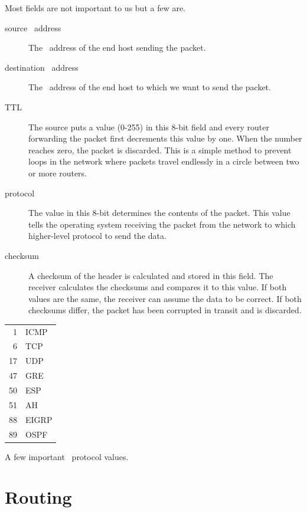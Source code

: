 Most fields are not important to us but a few are.
\begin{description}
\item[source \IP\ address]
   The \IP\ address of the end host sending the packet.
\item[destination \IP\ address]
   The \IP\ address of the end host to which we want to send the packet.
\item[\acf{TTL}]
   The source puts a value (0-255) in this 8-bit field and every router forwarding the packet first decrements this value by one.
   When the number reaches zero, the packet is discarded.
   This is a simple method to prevent loops in the network where packets travel endlessly in a circle between two or more routers.
\item[protocol]
   The value in this 8-bit determines the contents of the packet.
   This value tells the operating system receiving the packet from the network to which higher-level protocol to send the data.
\item[checksum]
   A checksum of the header is calculated and stored in this field.
   The receiver calculates the checksums and compares it to this value.
   If both values are the same, the receiver can assume the data to be correct.
   If both checksums differ, the packet has been corrupted in transit and is discarded.
\end{description}

\begin{margintable}
\begin{tabular}{rl}
 1 & \acs{ICMP}  \\
 6 & \acs{TCP}   \\
17 & \acs{UDP}   \\
47 & \acs{GRE}   \\
50 & \acs{ESP}   \\
51 & \acs{AH}    \\
88 & \acs{EIGRP} \\
89 & \acs{OSPF}  \\
\end{tabular}
\caption{A few important \IP\ protocol values.}
\end{margintable}


\section{Routing}
\label{sec:ip-routing}

